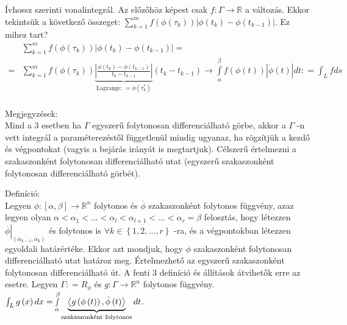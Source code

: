 \documentclass[12pt,a4paper]{scrartcl}
\newenvironment{definicio}{}{}
\newenvironment{megjegyzes}{}{}
\begin{document}
\begin{enumerate}
  Ívhossz szerinti vonalintegrál. Az előzőhöz képest csak
  \(\left. f:\Gamma\rightarrow{\mathbb{R}} \right.\) a változás. Ekkor
  tekintsük a következő összeget:
  \(\sum\limits_{k = 1}^{m}{f\left( {\phi\left( \tau_{k} \right)} \right)\left| {\phi\left( t_{k} \right) - \phi\left( t_{k - 1} \right)} \right|}\).
  Ez mihez tart? \[\begin{aligned}
     & \sum\limits_{k = 1}^m {f\left( {\phi \left( {{\tau _k}} \right)} \right)\left| {\phi \left( {{t_k}} \right) - \phi \left( {{t_{k - 1}}} \right)} \right|}  =  \\ 
     =  & \sum\limits_{k = 1}^m {f\left( {\phi \left( {{\tau _k}} \right)} \right)\underbrace {\left| {\frac{{\phi \left( {{t_k}} \right) - \phi \left( {{t_{k - 1}}} \right)}}{{{t_k} - {t_{k - 1}}}}} \right|}_{{\text{Lagrange: }} = \dot \phi \left( {\tau _k^ * } \right)}} \left( {{t_k} - {t_{k - 1}}} \right) \to \int\limits_\alpha ^\beta  {f\left( {\phi \left( t \right)} \right)\left| {\dot \phi \left( t \right)} \right|dt} : = \int_L {fds}  \\ 
  \end{aligned}\]
\end{enumerate}

\begin{megjegyzes}

Megjegyzések:\\
Mind a 3 esetben ha \(\Gamma\) egyszerű folytonosan differenciálható
görbe, akkor a \(\Gamma\) -n vett integrál a paraméterezéstől
függetlenül mindig ugyanaz, ha rögzítjük a kezdő és végpontokat (vagyis
a bejárás irányát is megtartjuk). Célszerű értelmezni a szakaszonként
folytonosan differenciálható utat (egyszerű szakaszonként folytonosan
differenciálható görbét).

\end{megjegyzes}

\begin{definicio}

Definíció:\\
Legyen
\(\left. \phi:\left\lbrack {\alpha,\beta} \right\rbrack\rightarrow{\mathbb{R}}^{n} \right.\)
folytonos és \(\overset{.}{\phi}\) szakaszonként folytonos függvény,
azaz legyen olyan
\(\alpha < \alpha_{1} < ... < \alpha_{l} < \alpha_{l + 1} < ... < \alpha_{r} = \beta\)
felosztás, hogy létezzen
\(\left. \overset{.}{\phi} \right|_{({\alpha_{k - 1},\alpha_{k}})}\) és
folytonos is \(\forall k \in \left\{ {1,2,...,r} \right\}\) -ra, és a
végpontokban létezzen egyoldali határértéke. Ekkor azt mondjuk, hogy
\(\phi\) szakaszonként folytonosan differenciálható utat határoz meg.
Értelmezhető az egyszerű szakaszonként folytonosan differenciálható út.
A fenti 3 definíció és állítások átvihetők erre az esetre. Legyen
\(\Gamma: = R_{\phi}\) és
\(\left. g:\Gamma\rightarrow{\mathbb{R}}^{n} \right.\) folytonos
függvény.
\(\int_L {g\left( x \right)dx} = \mathop \smallint \limits_\alpha ^\beta \underbrace {\left\langle {g\left( {\phi \left( t \right)} \right),\dot \phi \left( t \right)} \right\rangle }_{{\text{szakaszonként folytonos}}}dt\).

\end{definicio}
\end{document}
